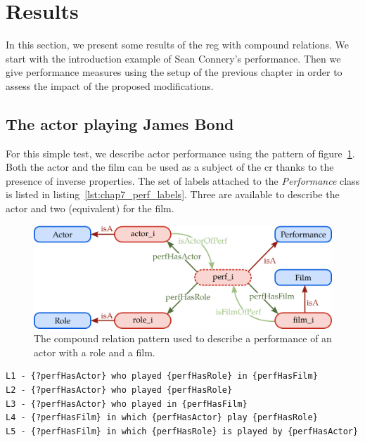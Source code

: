 \section{Results}

In this section, we present some results of the \acrshort{reg} with compound relations. We start with the introduction example of Sean Connery's performance. Then we give performance measures using the setup of the previous chapter in order to assess the impact of the proposed modifications. 

\subsection{The actor playing James Bond}

For this simple test, we describe actor performance using the pattern of figure~\ref{fig:chap7_perf}. Both the actor and the film can be used as a subject of the \acrshort{cr} thanks to the presence of inverse properties. The set of labels attached to the \textit{Performance} class is listed in listing~\ref{lst:chap7_perf_labels}. Three are available to describe the actor and two (equivalent) for the film.

\begin{figure}[ht!]
\centering
\includegraphics[scale=0.4]{figures/chapter7/perf.png}
\caption{\label{fig:chap7_perf} The compound relation pattern used to describe a performance of an actor with a role and a film.}
\end{figure}

\begin{lstlisting}[frame=single, caption={ The set of labels usable to discribe the performance compound relation.}, label={lst:chap7_perf_labels}, captionpos=b, style=Labels, mathescape=true]
L1 - {?perfHasActor} who played {perfHasRole} in {perfHasFilm}
L2 - {?perfHasActor} who played {perfHasRole}
L3 - {?perfHasActor} who played in {perfHasFilm}
L4 - {?perfHasFilm} in which {perfHasActor} play {perfHasRole}
L5 - {?perfHasFilm} in which {perfHasRole} is played by {perfHasActor}
\end{lstlisting}

